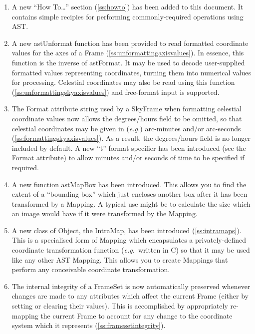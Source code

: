\documentclass[twoside,11pt]{article}
\newcommand{\htmlref}[2]{#1}
\newcommand{\secref}[1]{\S\ref{#1}}
\renewcommand{\secref}[1]{\ref{#1}}
\begin{document}
\begin{enumerate}

\item A new ``How To\ldots'' section (\secref{ss:howto}) has been
added to this document. It contains simple recipies for performing
commonly-required operations using AST.

\item A new \htmlref{astUnformat}{astUnformat} function has been provided to read formatted
coordinate values for the axes of a \htmlref{Frame}{Frame}
(\secref{ss:unformattingaxisvalues}). In essence, this function is the
inverse of \htmlref{astFormat}{astFormat}. It may be used to decode user-supplied formatted
values representing coordinates, turning them into numerical values
for processing. Celestial coordinates may also be read using this
function (\secref{ss:unformattingskyaxisvalues}) and free-format input
is supported.

\item The Format attribute string used by a \htmlref{SkyFrame}{SkyFrame} when formatting
celestial coordinate values now allows the degrees/hours field to be
omitted, so that celestial coordinates may be given in ({\em{e.g.}})
arc-minutes and/or arc-seconds
(\secref{ss:formattingskyaxisvalues}). As a result, the degrees/hours
field is no longer included by default.  A new ``t'' format specifier
has been introduced (see the Format attribute) to allow minutes and/or
seconds of time to be specified if required.

\item A new function \htmlref{astMapBox}{astMapBox} has been introduced. This allows you to
find the extent of a ``bounding box'' which just encloses another box
after it has been transformed by a \htmlref{Mapping}{Mapping}. A typical use might be to
calculate the size which an image would have if it were transformed by
the Mapping.

\item A new class of \htmlref{Object}{Object}, the \htmlref{IntraMap}{IntraMap}, has been introduced
(\secref{ss:intramaps}). This is a specialised form of Mapping which
encapsulates a privately-defined coordinate transformation function
({\em{e.g.}}\ written in C) so that it may be used like any other AST
Mapping. This allows you to create Mappings that perform any
conceivable coordinate transformation.

\item The internal integrity of a \htmlref{FrameSet}{FrameSet} is now automatically
preserved whenever changes are made to any attributes which affect the
current Frame (either by setting or clearing their values). This is
accomplished by appropriately re-mapping the current Frame to account
for any change to the coordinate system which it represents
(\secref{ss:framesetintegrity}).


\end{enumerate}
\end{document}
